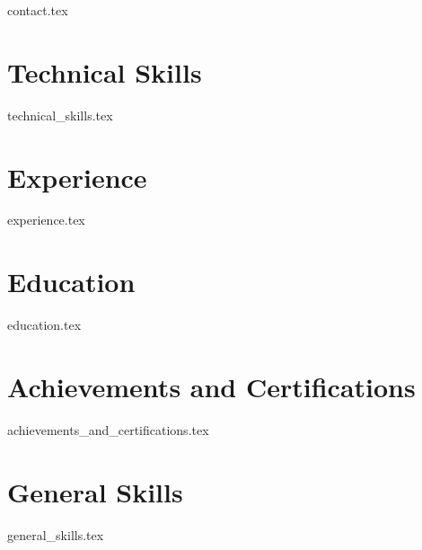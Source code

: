 \documentclass {article}
\renewcommand {\maketitle} {
	\begin{center}

	{\huge\bfseries \theauthor}

	 {contact.tex}

	\end{center}
}
\begin{document}
\author {Your name here}

\maketitle



\section {Technical Skills}

 {technical_skills.tex}




\section {Experience}

 {experience.tex}




\section{Education}

 {education.tex}





\section {Achievements and Certifications}

 {achievements_and_certifications.tex}





\section{General Skills}

 {general_skills.tex}

\end{document}
